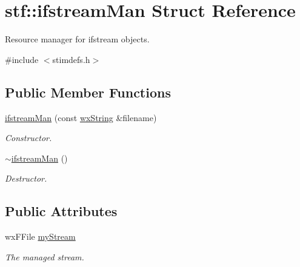 \hypertarget{structstf_1_1ifstreamMan}{
\section{stf::ifstreamMan Struct Reference}
\label{structstf_1_1ifstreamMan}
}


Resource manager for ifstream objects.  




{\ttfamily \#include $<$stimdefs.h$>$}

\subsection*{Public Member Functions}
\begin{DoxyCompactItemize}
\item 
\hyperlink{structstf_1_1ifstreamMan_a263e597e796869b2ba33d8c1c1710eda}{ifstreamMan} (const \hyperlink{classwxString}{wxString} \&filename)
\begin{DoxyCompactList}\small\item\em Constructor. \item\end{DoxyCompactList}\item 
\hypertarget{structstf_1_1ifstreamMan_a8dfe92a7e07d7002c112e2fd1108ac4a}{
\hyperlink{structstf_1_1ifstreamMan_a8dfe92a7e07d7002c112e2fd1108ac4a}{$\sim$ifstreamMan} ()}
\label{structstf_1_1ifstreamMan_a8dfe92a7e07d7002c112e2fd1108ac4a}

\begin{DoxyCompactList}\small\item\em Destructor. \item\end{DoxyCompactList}\end{DoxyCompactItemize}
\subsection*{Public Attributes}
\begin{DoxyCompactItemize}
\item 
\hypertarget{structstf_1_1ifstreamMan_a383b301d80c1582e2a41f41b2cdf132b}{
wxFFile \hyperlink{structstf_1_1ifstreamMan_a383b301d80c1582e2a41f41b2cdf132b}{myStream}}
\label{structstf_1_1ifstreamMan_a383b301d80c1582e2a41f41b2cdf132b}

\begin{DoxyCompactList}\small\item\em The managed stream. \item\end{DoxyCompactList}\end{DoxyCompactItemize}


